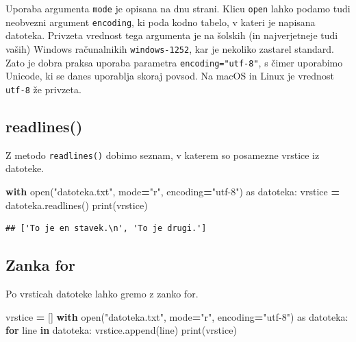 \documentclass[
]{report}
\newenvironment{Shaded}{\begin{snugshade}}{\end{snugshade}}
\newcommand{\BuiltInTok}[1]{#1}
\newcommand{\ControlFlowTok}[1]{\textcolor[rgb]{0.13,0.29,0.53}{\textbf{#1}}}
\newcommand{\ImportTok}[1]{#1}
\newcommand{\KeywordTok}[1]{\textcolor[rgb]{0.13,0.29,0.53}{\textbf{#1}}}
\newcommand{\NormalTok}[1]{#1}
\newcommand{\OperatorTok}[1]{\textcolor[rgb]{0.81,0.36,0.00}{\textbf{#1}}}
\newcommand{\StringTok}[1]{\textcolor[rgb]{0.31,0.60,0.02}{#1}}
\begin{document}
Uporaba argumenta \texttt{mode} je opisana na dnu strani.
Klicu \texttt{open} lahko podamo tudi neobvezni argument \texttt{encoding}, ki poda kodno
tabelo, v kateri je napisana datoteka. Privzeta vrednost tega argumenta je na
šolskih (in najverjetneje tudi vaših) Windows računalnikih \texttt{windows-1252}, kar je
nekoliko zastarel standard. Zato je dobra praksa uporaba parametra
\texttt{encoding="utf-8"}, s čimer uporabimo Unicode, ki se danes
uporablja skoraj povsod. Na macOS in Linux je vrednost \texttt{utf-8} že privzeta.

\hypertarget{readlines}{%
\subsection{readlines()}\label{readlines}}

Z metodo \texttt{readlines()} dobimo seznam, v katerem so posamezne
vrstice iz datoteke.

\begin{Shaded}
\begin{Highlighting}[]
\ControlFlowTok{with} \BuiltInTok{open}\NormalTok{(}\StringTok{"datoteka.txt"}\NormalTok{, mode}\OperatorTok{=}\StringTok{"r"}\NormalTok{, encoding}\OperatorTok{=}\StringTok{"utf{-}8"}\NormalTok{) }\ImportTok{as}\NormalTok{ datoteka:}
\NormalTok{    vrstice }\OperatorTok{=}\NormalTok{ datoteka.readlines()}
\BuiltInTok{print}\NormalTok{(vrstice)}
\end{Highlighting}
\end{Shaded}

\begin{verbatim}
## ['To je en stavek.\n', 'To je drugi.']
\end{verbatim}

\hypertarget{zanka-for-1}{%
\subsection{Zanka for}\label{zanka-for-1}}

Po vrsticah datoteke lahko gremo z zanko for.

\begin{Shaded}
\begin{Highlighting}[]
\NormalTok{vrstice }\OperatorTok{=}\NormalTok{ []}
\ControlFlowTok{with} \BuiltInTok{open}\NormalTok{(}\StringTok{"datoteka.txt"}\NormalTok{, mode}\OperatorTok{=}\StringTok{"r"}\NormalTok{, encoding}\OperatorTok{=}\StringTok{"utf{-}8"}\NormalTok{) }\ImportTok{as}\NormalTok{ datoteka:}
    \ControlFlowTok{for}\NormalTok{ line }\KeywordTok{in}\NormalTok{ datoteka:}
\NormalTok{        vrstice.append(line)}
\BuiltInTok{print}\NormalTok{(vrstice)}
\end{Highlighting}
\end{Shaded}
\end{document}
